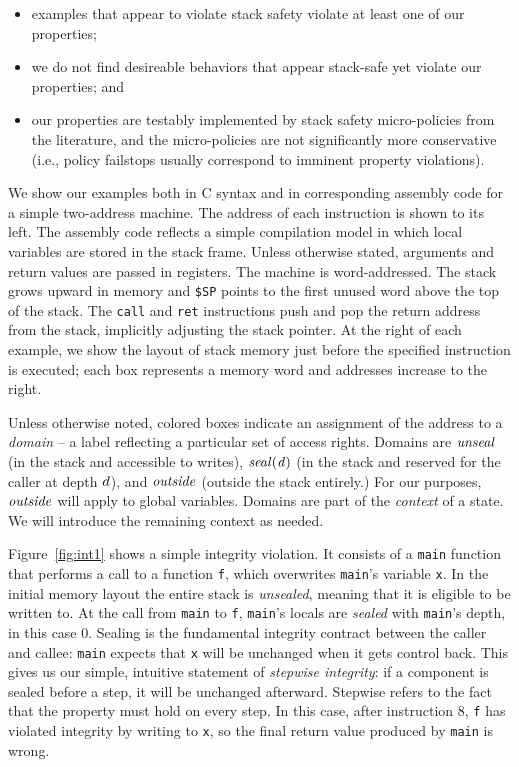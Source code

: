 \documentclass[acmsmall,review,anonymous]{acmart}\settopmatter{printfolios=true,printccs=false,printacmref=false}
\begin{document}
\begin{itemize}
\item examples that appear to violate stack safety violate at least one of our properties;
\item we do not find desireable behaviors that appear stack-safe yet violate our properties; and
\item our properties are testably implemented by stack safety micro-policies from the
  literature, and the micro-policies are not significantly more conservative
  (i.e., policy failstops usually correspond to imminent property violations).
\end{itemize}

We show our examples both in C syntax and in corresponding assembly code for a
simple two-address machine. The address of each instruction is shown to its left.
The assembly code reflects a simple compilation model in which
local variables are stored in the stack frame.
Unless otherwise stated, arguments and return values are passed in registers.
The machine is word-addressed. The stack grows upward in
memory and {\tt \$SP} points to the first unused word above the top of the stack.
The {\tt call} and {\tt ret} instructions push and pop the return address from the stack,
implicitly adjusting the stack pointer.
At the right of each example, we show the layout of stack memory just before
the specified instruction is executed; each box represents a memory word and
addresses increase to the right.

Unless otherwise noted, colored boxes indicate an assignment of the address to a
{\em domain} -- a label reflecting a particular set of access rights. Domains
are \(\mathit{unseal}\) (in the stack and accessible to writes), \(\mathit{seal(d)}\)
(in the stack and reserved for the caller at depth \(d\)), and \(\mathit{outside}\)
(outside the stack entirely.) For our purposes, \(\mathit{outside}\) will apply to global
variables. Domains are part of the {\em context} of a state.
We will introduce the remaining context as needed.

Figure~\ref{fig:int1} shows a simple integrity violation. It consists of a {\tt main}
function that performs a call to a function {\tt f}, which overwrites {\tt main}'s
variable {\tt x}. In the initial memory layout the entire stack is {\em unsealed},
meaning that it is eligible to be written to. At the call from {\tt main} to
{\tt f}, {\tt main}'s locals are {\em sealed} with {\tt main}'s depth,
in this case 0. Sealing is the fundamental integrity contract between the caller and callee:
{\tt main} expects that {\tt x} will be unchanged when it gets control back.
This gives us our simple, intuitive statement of {\em stepwise integrity}:
if a component is sealed before a step, it will be unchanged afterward. Stepwise
refers to the fact that the property must hold on every step. %
In this case, after instruction 8, {\tt f} has violated integrity by writing to {\tt x},
so the final return value produced by {\tt main} is wrong.
\end{document}
